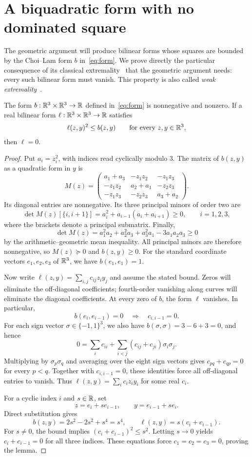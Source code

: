 \section{A biquadratic form with no dominated square}
\label{sec:form}

The geometric argument will produce bilinear forms whose squares are
bounded by the Choi--Lam form $b$ in~\eqref{eq:form}.
We prove directly the particular consequence of its classical
extremality~\cite[Theorem~4.4]{choi-lam-1977} that the geometric
argument needs: every such bilinear form must vanish. This property is
also called \emph{weak extremality}~\cite[Definition~2.7]{blekherman-raita-shankar-sinn-2022}.

\begin{lemma}\label{lem:form}
The form $b:\mathbb R^3\times\mathbb R^3\to\mathbb R$ defined in~\eqref{eq:form}
is nonnegative and nonzero. If a real bilinear form
$\ell:\mathbb R^3\times\mathbb R^3\to\mathbb R$ satisfies
\[
 \ell(z,y)^2\leq b(z,y)
 \qquad\text{for every }z,y\in\mathbb R^3,
\]
then $\ell=0$.
\end{lemma}

\begin{proof}
Put $a_i=z_i^2$, with indices read cyclically modulo $3$.
The matrix of $b(z,y)$ as a quadratic form in $y$ is
\[
 M(z)=
 \begin{pmatrix}
 a_1+a_3&-z_1z_2&-z_1z_3\\
 -z_1z_2&a_2+a_1&-z_2z_3\\
 -z_1z_3&-z_2z_3&a_3+a_2
 \end{pmatrix}.
\]
Its diagonal entries are nonnegative. Its three principal minors of
order two are
\[
 \det M(z)[\{i,i+1\}]
 =a_i^2+a_{i-1}(a_i+a_{i+1})\geq0,
 \qquad i=1,2,3,
\]
where the brackets denote a principal submatrix. Finally,
\[
 \det M(z)
 =a_1^2a_2+a_2^2a_3+a_3^2a_1-3a_1a_2a_3\geq0
\]
by the arithmetic--geometric mean inequality. All principal minors
are therefore nonnegative, so $M(z)\succeq0$ and $b(z,y)\geq0$.
For the standard coordinate vectors $e_1,e_2,e_3$ of $\mathbb R^3$,
we have $b(e_1,e_1)=1$.

Now write $\ell(z,y)=\sum_{i,j}c_{ij}z_i y_j$ and assume the stated
bound. Zeros will eliminate the off-diagonal coefficients; fourth-order
vanishing along curves will eliminate the diagonal coefficients.
At every zero of $b$, the form $\ell$ vanishes.
In particular,
\[
 b(e_i,e_{i-1})=0
 \quad\Longrightarrow\quad c_{i,i-1}=0.
\]
For each sign vector $\sigma\in\{-1,1\}^3$, we also have
$b(\sigma,\sigma)=3-6+3=0$, and hence
\[
 0=\sum_i c_{ii}
   +\sum_{i<j}(c_{ij}+c_{ji})\sigma_i\sigma_j.
\]
Multiplying by $\sigma_p\sigma_q$ and averaging over the eight sign
vectors gives $c_{pq}+c_{qp}=0$ for every $p<q$.
Together with $c_{i,i-1}=0$, these identities force all off-diagonal
entries to vanish. Thus $\ell(z,y)=\sum_i c_i z_i y_i$ for some real $c_i$.

For a cyclic index $i$ and $s\in\mathbb R$, set
\[
 z=e_i+s e_{i-1},\qquad y=e_{i-1}+s e_i.
\]
Direct substitution gives
\[
 b(z,y)=2s^2-2s^2+s^4=s^4,
 \qquad \ell(z,y)=s(c_i+c_{i-1}).
\]
For $s\ne0$, the bound implies $(c_i+c_{i-1})^2\leq s^2$.
Letting $s\to0$ yields $c_i+c_{i-1}=0$ for all three indices.
These equations force $c_1=c_2=c_3=0$, proving the lemma.
\end{proof}
